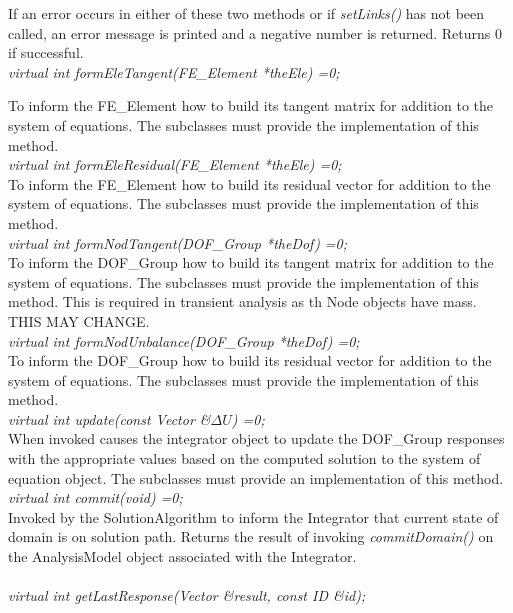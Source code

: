 \noindent If an error occurs in either of these two methods or if {\em
setLinks()} has not been called, an error message is printed and a
negative number is returned. Returns $0$ if successful. \\ 


{\em virtual int formEleTangent(FE\_Element *theEle) =0;} 

To inform the FE\_Element how to build its tangent matrix for addition
to the system of equations. The subclasses must provide the
implementation of this method. \\

{\em virtual int formEleResidual(FE\_Element *theEle) =0;} \\
To inform the FE\_Element how to build its residual vector for addition
to the system of equations. The subclasses must provide the
implementation of this method. \\

{\em virtual int formNodTangent(DOF\_Group *theDof) =0;} \\
To inform the DOF\_Group how to build its tangent matrix for addition
to the system of equations. The subclasses must provide the
implementation of this method. This is required in transient analysis
as th Node objects have mass. THIS MAY CHANGE.\\

{\em virtual int formNodUnbalance(DOF\_Group *theDof) =0;} \\
To inform the DOF\_Group how to build its residual vector for addition
to the system of equations. The subclasses must provide the
implementation of this method. \\

{\em virtual int update(const Vector \&$\Delta U$) =0;} \\
When invoked causes the integrator object to update the DOF\_Group
responses with the appropriate values based on the computed solution
to the system of equation object. The subclasses must provide an
implementation of this method. \\

{\em virtual int commit(void) =0;} \\
Invoked by the SolutionAlgorithm to inform the Integrator that current
state of domain is on solution path. Returns the result of invoking
{\em commitDomain()} on the AnalysisModel object associated with the
Integrator. \\


\\
{\em virtual int getLastResponse(Vector \&result, const ID \&id);} 

